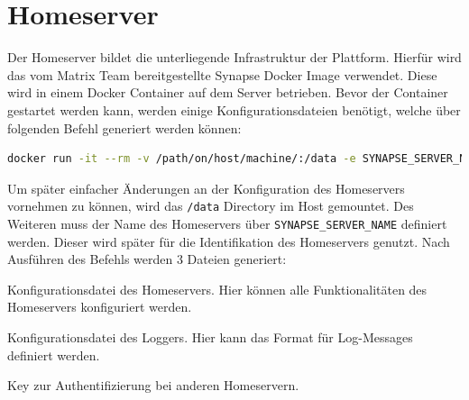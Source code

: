     \section{Homeserver}\label{sec:homeserver}
    Der Homeserver bildet die unterliegende Infrastruktur der Plattform.
    Hierfür wird das vom Matrix Team bereitgestellte Synapse Docker Image verwendet.
    Diese wird in einem Docker Container auf dem Server betrieben.
    Bevor der Container gestartet werden kann, werden einige Konfigurationsdateien benötigt, welche über folgenden Befehl generiert werden können:
    \begin{lstlisting}[language=bash,label={lst:synapse-generate}]
docker run -it --rm -v /path/on/host/machine/:/data -e SYNAPSE_SERVER_NAME=my.matrix.host -e SYNAPSE_REPORT_STATS=yes matrixdotorg/synapse:latest generate
    \end{lstlisting}
    Um später einfacher Änderungen an der Konfiguration des Homeservers vornehmen zu können, wird das \texttt{/data} Directory im Host gemountet.
    Des Weiteren muss der Name des Homeservers über \texttt{SYNAPSE\_SERVER\_NAME} definiert werden.
    Dieser wird später für die Identifikation des Homeservers genutzt.
    Nach Ausführen des Befehls werden 3 Dateien generiert:
    \begin{description}[leftmargin=!,labelwidth=4cm]
        \item [homeserver.yaml] Konfigurationsdatei des Homeservers. Hier können alle Funktionalitäten des Homeservers konfiguriert werden.
        \item [my.matrix.host.log.config] Konfigurationsdatei des Loggers. Hier kann das Format für Log-Messages definiert werden.
        \item [my.matrix.host.signing.key] Key zur Authentifizierung bei anderen Homeservern.
    \end{description}

